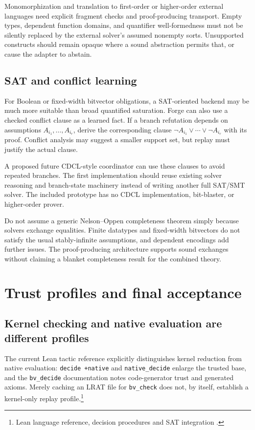 \documentclass[11pt,a4paper]{article}
\newcommand{\code}[1]{\texttt{#1}}
\begin{document}
Monomorphization and translation to first-order or higher-order external
languages need explicit fragment checks and proof-producing transport. Empty
types, dependent function domains, and quantifier well-formedness must not be
silently replaced by the external solver's assumed nonempty sorts. Unsupported
constructs should remain opaque where a sound abstraction permits that, or
cause the adapter to abstain.

\subsection{SAT and conflict learning}
For Boolean or fixed-width bitvector obligations, a SAT-oriented backend may be
much more suitable than broad quantified saturation. Forge can also use a
checked conflict clause as a learned fact. If a branch refutation depends on
assumptions $A_{i_1},\ldots,A_{i_r}$, derive the corresponding clause
$\neg A_{i_1}\lor\cdots\lor\neg A_{i_r}$ with its proof. Conflict analysis may
suggest a smaller support set, but replay must justify the actual clause.

A proposed future CDCL-style coordinator can use these clauses to avoid
repeated branches. The first implementation should reuse existing solver
reasoning and branch-state machinery instead of writing another full SAT/SMT
solver. The included prototype has no CDCL implementation, bit-blaster, or
higher-order prover.

Do not assume a generic Nelson--Oppen completeness theorem simply because
solvers exchange equalities. Finite datatypes and fixed-width bitvectors do not
satisfy the usual stably-infinite assumptions, and dependent encodings add
further issues. The proof-producing architecture supports sound exchanges
without claiming a blanket completeness result for the combined theory.

\section{Trust profiles and final acceptance}
\label{sec:trust}

\subsection{Kernel checking and native evaluation are different profiles}
The current Lean tactic reference explicitly distinguishes kernel reduction
from native evaluation: \code{decide +native} and \code{native\_decide} enlarge
the trusted base, and the \code{bv\_decide} documentation notes code-generator
trust and generated axioms. Merely caching an LRAT file for \code{bv\_check}
does not, by itself, establish a kernel-only replay profile.\footnote{Lean
language reference, decision procedures and SAT integration \cite{tactics}.}
\end{document}
